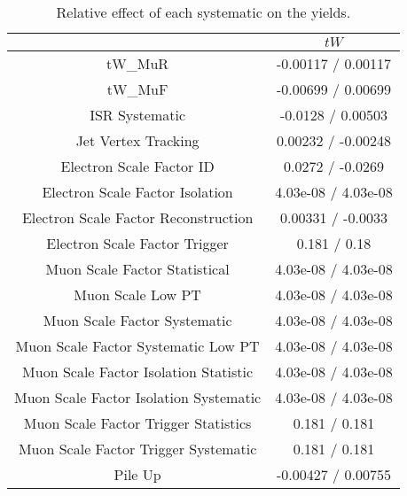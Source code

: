 \documentclass[10pt]{article}
\begin{document}
\begin{table}[htbp]
\begin{center}
\begin{tabular}{|c|c|}
\hline 
      & $tW$ \\ 
\hline 
  tW_MuR & -0.00117 / 0.00117 \\ 
  tW_MuF & -0.00699 / 0.00699 \\ 
  ISR Systematic & -0.0128 / 0.00503 \\ 
  Jet Vertex Tracking & 0.00232 / -0.00248 \\ 
  Electron Scale Factor ID & 0.0272 / -0.0269 \\ 
  Electron Scale Factor Isolation & 4.03e-08 / 4.03e-08 \\ 
  Electron Scale Factor Reconstruction & 0.00331 / -0.0033 \\ 
  Electron Scale Factor Trigger & 0.181 / 0.18 \\ 
  Muon Scale Factor Statistical & 4.03e-08 / 4.03e-08 \\ 
  Muon Scale Low PT & 4.03e-08 / 4.03e-08 \\ 
  Muon Scale Factor Systematic & 4.03e-08 / 4.03e-08 \\ 
  Muon Scale Factor Systematic Low PT & 4.03e-08 / 4.03e-08 \\ 
  Muon Scale Factor Isolation Statistic & 4.03e-08 / 4.03e-08 \\ 
  Muon Scale Factor Isolation Systematic & 4.03e-08 / 4.03e-08 \\ 
  Muon Scale Factor Trigger Statistics & 0.181 / 0.181 \\ 
  Muon Scale Factor Trigger Systematic & 0.181 / 0.181 \\ 
  Pile Up & -0.00427 / 0.00755 \\ 
\hline 
\end{tabular} 
\caption{Relative effect of each systematic on the yields.} 
\end{center} 
\end{table} 
\end{document}
